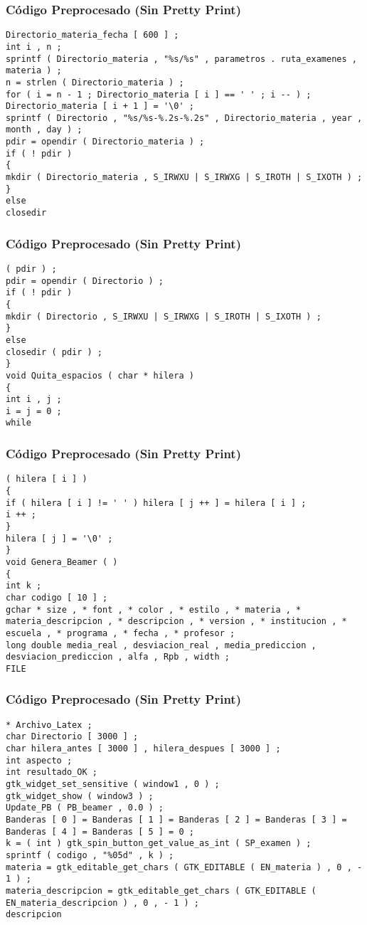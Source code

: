 \documentclass{beamer}
\begin{document}
\begin{frame}[fragile]
\frametitle{C\'odigo Preprocesado (Sin Pretty Print)}
\begin{lstlisting}[style=CStyle]
Directorio_materia_fecha [ 600 ] ; 
int i , n ; 
sprintf ( Directorio_materia , "%s/%s" , parametros . ruta_examenes , materia ) ; 
n = strlen ( Directorio_materia ) ; 
for ( i = n - 1 ; Directorio_materia [ i ] == ' ' ; i -- ) ; 
Directorio_materia [ i + 1 ] = '\0' ; 
sprintf ( Directorio , "%s/%s-%.2s-%.2s" , Directorio_materia , year , month , day ) ; 
pdir = opendir ( Directorio_materia ) ; 
if ( ! pdir ) 
{ 
mkdir ( Directorio_materia , S_IRWXU | S_IRWXG | S_IROTH | S_IXOTH ) ; 
} 
else 
closedir \end{lstlisting}
\end{frame}
\begin{frame}[fragile]
\frametitle{C\'odigo Preprocesado (Sin Pretty Print)}
\begin{lstlisting}[style=CStyle]
( pdir ) ; 
pdir = opendir ( Directorio ) ; 
if ( ! pdir ) 
{ 
mkdir ( Directorio , S_IRWXU | S_IRWXG | S_IROTH | S_IXOTH ) ; 
} 
else 
closedir ( pdir ) ; 
} 
void Quita_espacios ( char * hilera ) 
{ 
int i , j ; 
i = j = 0 ; 
while \end{lstlisting}
\end{frame}
\begin{frame}[fragile]
\frametitle{C\'odigo Preprocesado (Sin Pretty Print)}
\begin{lstlisting}[style=CStyle]
( hilera [ i ] ) 
{ 
if ( hilera [ i ] != ' ' ) hilera [ j ++ ] = hilera [ i ] ; 
i ++ ; 
} 
hilera [ j ] = '\0' ; 
} 
void Genera_Beamer ( ) 
{ 
int k ; 
char codigo [ 10 ] ; 
gchar * size , * font , * color , * estilo , * materia , * materia_descripcion , * descripcion , * version , * institucion , * escuela , * programa , * fecha , * profesor ; 
long double media_real , desviacion_real , media_prediccion , desviacion_prediccion , alfa , Rpb , width ; 
FILE \end{lstlisting}
\end{frame}
\begin{frame}[fragile]
\frametitle{C\'odigo Preprocesado (Sin Pretty Print)}
\begin{lstlisting}[style=CStyle]
* Archivo_Latex ; 
char Directorio [ 3000 ] ; 
char hilera_antes [ 3000 ] , hilera_despues [ 3000 ] ; 
int aspecto ; 
int resultado_OK ; 
gtk_widget_set_sensitive ( window1 , 0 ) ; 
gtk_widget_show ( window3 ) ; 
Update_PB ( PB_beamer , 0.0 ) ; 
Banderas [ 0 ] = Banderas [ 1 ] = Banderas [ 2 ] = Banderas [ 3 ] = Banderas [ 4 ] = Banderas [ 5 ] = 0 ; 
k = ( int ) gtk_spin_button_get_value_as_int ( SP_examen ) ; 
sprintf ( codigo , "%05d" , k ) ; 
materia = gtk_editable_get_chars ( GTK_EDITABLE ( EN_materia ) , 0 , - 1 ) ; 
materia_descripcion = gtk_editable_get_chars ( GTK_EDITABLE ( EN_materia_descripcion ) , 0 , - 1 ) ; 
descripcion \end{lstlisting}
\end{frame}
\end{document}
